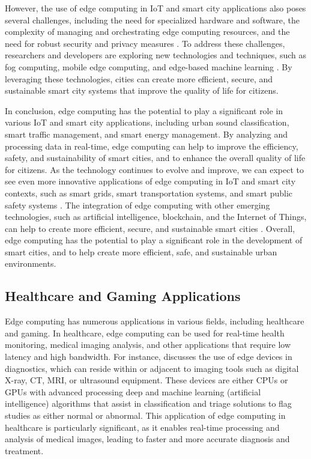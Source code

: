 \documentclass[11pt]{article}
\begin{document}
However, the use of edge computing in IoT and smart city applications also poses several challenges, including the need for specialized hardware and software, the complexity of managing and orchestrating edge computing resources, and the need for robust security and privacy measures \cite{ref25}. To address these challenges, researchers and developers are exploring new technologies and techniques, such as fog computing, mobile edge computing, and edge-based machine learning \cite{ref48}. By leveraging these technologies, cities can create more efficient, secure, and sustainable smart city systems that improve the quality of life for citizens.

In conclusion, edge computing has the potential to play a significant role in various IoT and smart city applications, including urban sound classification, smart traffic management, and smart energy management. By analyzing and processing data in real-time, edge computing can help to improve the efficiency, safety, and sustainability of smart cities, and to enhance the overall quality of life for citizens. As the technology continues to evolve and improve, we can expect to see even more innovative applications of edge computing in IoT and smart city contexts, such as smart grids, smart transportation systems, and smart public safety systems \cite{ref49}. The integration of edge computing with other emerging technologies, such as artificial intelligence, blockchain, and the Internet of Things, can help to create more efficient, secure, and sustainable smart cities \cite{ref50}. Overall, edge computing has the potential to play a significant role in the development of smart cities, and to help create more efficient, safe, and sustainable urban environments.

\subsection{Healthcare and Gaming Applications}

Edge computing has numerous applications in various fields, including healthcare and gaming. In healthcare, edge computing can be used for real-time health monitoring, medical imaging analysis, and other applications that require low latency and high bandwidth. For instance, \cite{ref51} discusses the use of edge devices in diagnostics, which can reside within or adjacent to imaging tools such as digital X-ray, CT, MRI, or ultrasound equipment. These devices are either CPUs or GPUs with advanced processing deep and machine learning (artificial intelligence) algorithms that assist in classification and triage solutions to flag studies as either normal or abnormal. This application of edge computing in healthcare is particularly significant, as it enables real-time processing and analysis of medical images, leading to faster and more accurate diagnosis and treatment.
\end{document}
